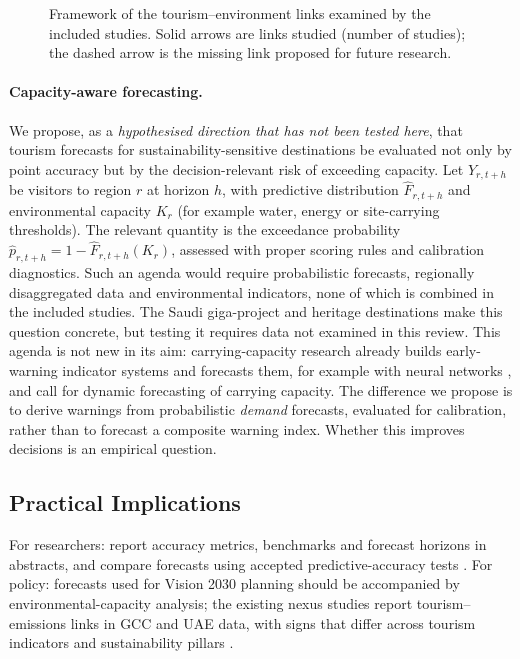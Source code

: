 \documentclass[11pt,a4paper]{article}
\begin{document}
\begin{figure}[t]\centering

\caption{Framework of the tourism--environment links examined by the included studies. Solid arrows are links studied (number of studies); the dashed arrow is the missing link proposed for future research.}\label{fig:framework}
\end{figure}

\paragraph{Capacity-aware forecasting.}
We propose, as a \emph{hypothesised direction that has not been tested here}, that tourism forecasts for sustainability-sensitive destinations be evaluated not only by point accuracy but by the decision-relevant risk of exceeding capacity. Let $Y_{r,t+h}$ be visitors to region $r$ at horizon $h$, with predictive distribution $\hat F_{r,t+h}$ and environmental capacity $K_r$ (for example water, energy or site-carrying thresholds). The relevant quantity is the exceedance probability $\hat p_{r,t+h}=1-\hat F_{r,t+h}(K_r)$, assessed with proper scoring rules and calibration diagnostics. Such an agenda would require probabilistic forecasts, regionally disaggregated data and environmental indicators, none of which is combined in the included studies. The Saudi giga-project and heritage destinations make this question concrete, but testing it requires data not examined in this review. This agenda is not new in its aim: carrying-capacity research already builds early-warning indicator systems and forecasts them, for example with neural networks \citep{Ye2020}, and \citet{Long2022} call for dynamic forecasting of carrying capacity. The difference we propose is to derive warnings from probabilistic \emph{demand} forecasts, evaluated for calibration, rather than to forecast a composite warning index. Whether this improves decisions is an empirical question.

\subsection{Practical Implications}
For researchers: report accuracy metrics, benchmarks and forecast horizons in abstracts, and compare forecasts using accepted predictive-accuracy tests \citep{Diebold1995}. For policy: forecasts used for Vision 2030 planning should be accompanied by environmental-capacity analysis; the existing nexus studies report tourism--emissions links in GCC and UAE data, with signs that differ across tourism indicators and sustainability pillars \citep{Farooq2023a,Zmami2024,Majumdar2022}.
\end{document}
